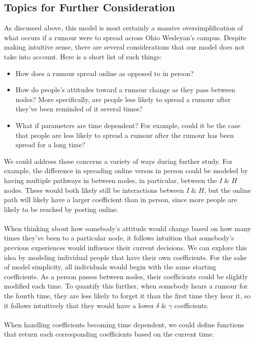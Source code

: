 \documentclass[11pt]{article}
\begin{document}
\subsection{Topics for Further Consideration}
As discussed above, this model is most certainly a massive oversimplification of what occurs if a rumour were to spread across Ohio Wesleyan's campus.
Despite making intuitive sense, there are several considerations that our model does not take into account.  Here is a short list of such things:
\begin{itemize}
    \item How does a rumour spread online as opposed to in person?
    \item How do people's attitudes toward a rumour change as they pass between nodes?  More specifically, are people less likely to spread a rumour after they've been reminded of it several times?
    \item What if parameters are time dependent?  For example, could it be the case that people are less likely to spread a rumour after the rumour has been spread for a long time?
\end{itemize}
We could address these concerns a variety of ways during further study.  For example, the difference in spreading online versus in person could be modeled by having multiple pathways in between nodes, in particular, between the $I\; \& \; H$ nodes.
These would both likely still be interactions between $I \; \& \; H$, but the online path will likely have a larger coefficient than in person, since more people are likely to be reached by posting online. \\ \\
When thinking about how somebody's attitude would change based on how many times they've been to a particular node, it follows intuition that somebody's previous experiences would influence their current decisions.
We can explore this idea by modeling individual people that have their own coefficients.
For the sake of model simplicity, all individuals would begin with the same starting coefficients.
As a person passes between nodes, their coefficients could be slightly modified each time.  
To quantify this further, when somebody hears a rumour for the fourth time, they are less likely to forget it than the first time they hear it, so it follows intuitively that they would have a lower $\delta \; \& \; \gamma$ coefficients. \\ \\
When handling coefficients becoming time dependent, we could define functions that return each corresponding coefficients based on the current time.  
\end{document}

